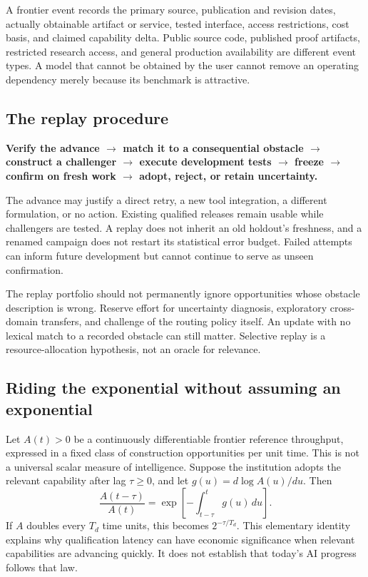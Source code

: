 \documentclass[11pt,letterpaper]{article}
\theoremstyle{remark}\newtheorem{remark}{Remark}[section]
\begin{document}
A frontier event records the primary source, publication and revision dates, actually obtainable artifact or service, tested interface, access restrictions, cost basis, and claimed capability delta. Public source code, published proof artifacts, restricted research access, and general production availability are different event types. A model that cannot be obtained by the user cannot remove an operating dependency merely because its benchmark is attractive.

\subsection{The replay procedure}
\begin{statusbox}
\textbf{Verify the advance $\rightarrow$ match it to a consequential obstacle $\rightarrow$ construct a challenger $\rightarrow$ execute development tests $\rightarrow$ freeze $\rightarrow$ confirm on fresh work $\rightarrow$ adopt, reject, or retain uncertainty.}
\end{statusbox}

The advance may justify a direct retry, a new tool integration, a different formulation, or no action. Existing qualified releases remain usable while challengers are tested. A replay does not inherit an old holdout's freshness, and a renamed campaign does not restart its statistical error budget. Failed attempts can inform future development but cannot continue to serve as unseen confirmation.

The replay portfolio should not permanently ignore opportunities whose obstacle description is wrong. Reserve effort for uncertainty diagnosis, exploratory cross-domain transfers, and challenge of the routing policy itself. An update with no lexical match to a recorded obstacle can still matter. Selective replay is a resource-allocation hypothesis, not an oracle for relevance.

\subsection{Riding the exponential without assuming an exponential}
Let $A(t)>0$ be a continuously differentiable frontier reference throughput, expressed in a fixed class of construction opportunities per unit time. This is not a universal scalar measure of intelligence. Suppose the institution adopts the relevant capability after lag $\tau\geq0$, and let $g(u)=d\log A(u)/du$. Then
\begin{equation}
\frac{A(t-\tau)}{A(t)}=\exp\!\left[-\int_{t-\tau}^{t}g(u)\,du\right].
\label{eq:lag}
\end{equation}
If $A$ doubles every $T_d$ time units, this becomes $2^{-\tau/T_d}$. This elementary identity explains why qualification latency can have economic significance when relevant capabilities are advancing quickly. It does not establish that today's AI progress follows that law.
\end{document}
